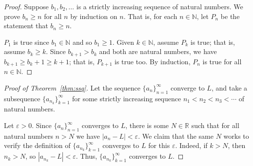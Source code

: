\documentclass[12pt]{amsart}
\def\e{\varepsilon}
\newcommand{\R}{{\mathbb{R}}}
\newcommand{\N}{\mathbb{N}}
\numberwithin{equation}{section}
\theoremstyle{plain} %
\theoremstyle{definition}
\theoremstyle{remark}
\begin{document}
\begin{proof} Suppose $b_1, b_2, \dots$ is a strictly increasing
	sequence of natural numbers. We prove $b_n \geq n$ for all $n$ by
	induction on $n$. 
	That is, for each $n  \in \N$, let $P_n$ be
	the statement that $b_n \geq n$. 
	
	$P_1$ is true since $b_1 \in \N$ and so $b_1 \geq 1$. Given $k \in \N$, assume $P_k$ is true; that is, assume $b_k \geq k$. Since $b_{k+1} >
	b_k$ and both are natural numbers, we have $b_{k+1} \geq b_k + 1 \geq k+1$; that is, $P_{k+1}$ is true too. By induction, $P_n$ is true for all $n \in \N$. 
\end{proof}

\begin{proof}[Proof of Theorem~\ref{thm:ssq}] Let the sequence $\{a_n\}_{n=1}^\infty$ converge to $L$, and take a subsequence $\{a_{n_k}\}_{k=1}^\infty$ for some strictly increasing sequence $n_1 < n_2 < n_3 < \cdots$ of natural numbers. 

Let $\e>0$. Since $\{a_n\}_{n=1}^\infty$ converges to $L$, there is some $N\in \R$ such that for all natural numbers $n>N$ we have $|a_n - L|<\e$. We claim that the same $N$ works to verify the definition of $\{a_{n_k}\}_{k=1}^\infty$ converges to $L$ for this $\e$. Indeed, if $k>N$, then $n_k > N$, so $|a_{n_k} - L| < \e$. Thus, $\{a_{n_k}\}_{k=1}^\infty$ converges to $L$.
\end{proof}
\end{document}

